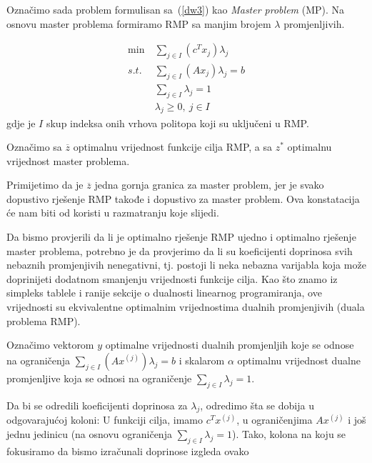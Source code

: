 \documentclass[a4paper, utf8, 11pt, colorlinks]{book}
\begin{document}
 Označimo sada problem formulisan  sa~(\ref{dw3}) kao \emph{Master problem} (MP). Na osnovu master problema formiramo RMP sa manjim brojem $\lambda$ promjenljivih.
 
     \begin{equation}
 	\begin{aligned}\label{dw4}
 		\min\  & \sum_{j\in I}(c^T x_j)\lambda_j\\
 		s.t.\  &\sum_{j\in I} (A x_j)\lambda_j=b\\
 		&\sum_{j\in I}\lambda_j = 1\\
 		&\lambda_j\geqslant 0,\ j  \in I
 	\end{aligned}
 \end{equation}
gdje je $I$ skup indeksa onih vrhova politopa koji su uključeni u RMP.

Označimo sa $\overline{z}$ optimalnu vrijednost funkcije cilja RMP, a sa $z^*$ optimalnu vrijednost master problema.

Primijetimo da je $\overline{z}$ jedna gornja granica za master problem, jer je svako dopustivo rješenje RMP takođe i dopustivo za master problem. Ova konstatacija će nam biti od koristi u razmatranju koje slijedi.

Da bismo provjerili da li je optimalno rješenje RMP ujedno i optimalno rješenje master problema, potrebno je da provjerimo da li su koeficijenti doprinosa svih nebaznih promjenjivih nenegativni, tj. postoji li neka nebazna varijabla koja može doprinijeti dodatnom smanjenju vrijednosti funkcije cilja. Kao što znamo iz simpleks tablele i ranije sekcije o dualnosti linearnog programiranja, ove vrijednosti su ekvivalentne optimalnim vrijednostima dualnih promjenjivih (duala problema RMP).   



Označimo vektorom $y$ optimalne vrijednosti dualnih promjenljih koje se odnose na ograničenja $\sum_{j\in I} (A x^{(j)})\lambda_j=b$ i skalarom $\alpha$ optimalnu vrijednost dualne promjenljive koja se odnosi na ograničenje $\sum_{j\in I}\lambda_j = 1$. 

Da bi se odredili   koeficijenti doprinosa za $\lambda_j$, odredimo šta se dobija u odgovarajućoj koloni: U funkciji cilja, imamo $c^Tx^{(j)}$, u ograničenjima $A x^{(j)} $ i još jednu jedinicu (na osnovu ograničenja $\sum_{j\in I}\lambda_j = 1$). Tako, kolona na koju se fokusiramo da bismo izračunali doprinose izgleda ovako
\end{document}
